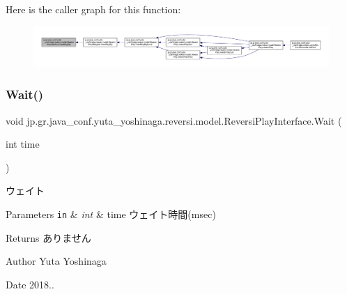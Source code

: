Here is the caller graph for this function\+:
\nopagebreak
\begin{figure}[H]
\begin{center}
\leavevmode
\includegraphics[width=350pt]{interfacejp_1_1gr_1_1java__conf_1_1yuta__yoshinaga_1_1reversi_1_1model_1_1_reversi_play_interface_a189301a8c066e9421a26d1f2df95b56e_icgraph}
\end{center}
\end{figure}
\mbox{\label{interfacejp_1_1gr_1_1java__conf_1_1yuta__yoshinaga_1_1reversi_1_1model_1_1_reversi_play_interface_abd7fc4193840e8c7bdf95bc538e1b649}} 
\subsubsection{\texorpdfstring{Wait()}{Wait()}}
{\footnotesize\ttfamily void jp.\+gr.\+java\+\_\+conf.\+yuta\+\_\+yoshinaga.\+reversi.\+model.\+Reversi\+Play\+Interface.\+Wait (\begin{DoxyParamCaption}\item[{int}]{time }\end{DoxyParamCaption})}



ウェイト 


\begin{DoxyParams}[1]{Parameters}
\mbox{\tt in}  & {\em int} & time ウェイト時間(msec) \\
\hline
\end{DoxyParams}
\begin{DoxyReturn}{Returns}
ありません 
\end{DoxyReturn}
\begin{DoxyAuthor}{Author}
Yuta Yoshinaga 
\end{DoxyAuthor}
\begin{DoxyDate}{Date}
2018.. 
\end{DoxyDate}


